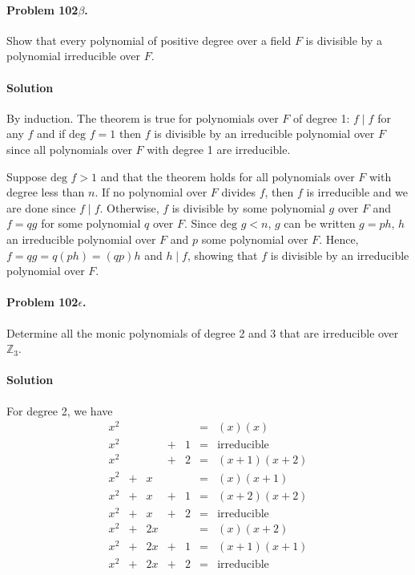 \paragraph{Problem 102$\beta$.}
Show that every polynomial of positive degree over a field $F$ is divisible
by a polynomial irreducible over $F$.

\paragraph*{Solution}
By induction. The theorem is true for polynomials over $F$ of degree 1: $f \mid f$ for
any $f$ and if $\mbox{deg } f = 1$ then $f$ is divisible by an irreducible
polynomial over $F$ since all polynomials over $F$ with degree 1 are irreducible.

Suppose $\mbox{deg } f > 1$ and that the theorem holds for all polynomials over $F$
with degree less than $n$. If no polynomial over $F$ divides $f$, then $f$
is irreducible and we are done since $f \mid f$. Otherwise, $f$ is divisible
by some polynomial $g$ over $F$ and $f = qg$ for some polynomial $q$ over $F$.
Since $\mbox{deg } g < n$, $g$ can be written $g = ph$, $h$ an irreducible
polynomial over $F$ and $p$ some polynomial over $F$. Hence, $f = qg = q(ph)
= (qp)h$ and $h \mid f$, showing that $f$ is divisible by an irreducible polynomial
over $F$.

\paragraph{Problem 102$\epsilon$.}
Determine all the monic polynomials of degree 2 and 3 that are irreducible over
$\mathbb{Z}_3$.

\paragraph*{Solution}
For degree 2, we have
$$
\begin{array}{ccccccl}
x^2 &   &    &   &   & = & (x)(x) \\
x^2 &   &    & + & 1 & = & \mbox{irreducible} \\
x^2 &   &    & + & 2 & = & (x+1)(x+2) \\
x^2 & + &  x &   &   & = & (x)(x+1) \\
x^2 & + &  x & + & 1 & = & (x+2)(x+2) \\
x^2 & + &  x & + & 2 & = & \mbox{irreducible} \\
x^2 & + & 2x &   &   & = & (x)(x+2) \\
x^2 & + & 2x & + & 1 & = & (x+1)(x+1) \\
x^2 & + & 2x & + & 2 & = & \mbox{irreducible} \\
\end{array}
$$


